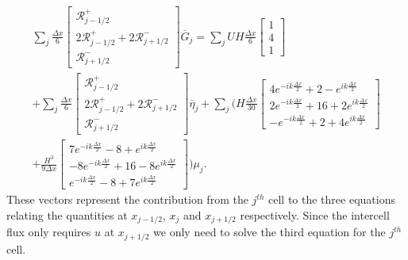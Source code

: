 \begin{multline*}
\sum_j \frac{\Delta x}{6}\begin{bmatrix} \mathcal{R}^+_{j -1/2} \\2 \mathcal{R}^+_{j -1/2} +2 \mathcal{R}^-_{j +1/2}\\ \mathcal{R}^-_{j +1/2} \end{bmatrix} \overline{G}_{j} = \sum_jUH \frac{\Delta x}{6}\begin{bmatrix} 1 \\4 \\ 1 \end{bmatrix}  \\+  \sum_j \frac{\Delta x}{6}\begin{bmatrix} \mathcal{R}^+_{j -1/2} \\2 \mathcal{R}^+_{j -1/2} +2 \mathcal{R}^-_{j +1/2}\\ \mathcal{R}^-_{j +1/2} \end{bmatrix} \overline{\eta}_{j}  + \sum_j \Bigg(H\frac{\Delta x}{30}\begin{bmatrix} 4e^{-ik\frac{\Delta x}{2}} +  2 - e^{ik\frac{\Delta x}{2}}\\2e^{-ik\frac{\Delta x}{2}}  + 16  +2 e^{ik\frac{\Delta x}{2}}  \\ -e^{-ik\frac{\Delta x}{2}} +  2 + 4e^{ik\frac{\Delta x}{2}} \end{bmatrix} \\+ \frac{H^3 }{9\Delta x}\begin{bmatrix} 7e^{-ik\frac{\Delta x}{2}} -8 + e^{ik\frac{\Delta x}{2}} \\ -8e^{-ik\frac{\Delta x}{2}} +  16  -8e^{ik\frac{\Delta x}{2}} \\ e^{-ik\frac{\Delta x}{2}} -8 + 7e^{ik\frac{\Delta x}{2}} \end{bmatrix}  \Bigg) \mu_j.
\end{multline*}
These vectors represent the contribution from the $j^{th}$ cell to the three equations relating the quantities at $x_{j-1/2}$, $x_j$ and $x_{j+1/2}$ respectively. Since the intercell flux only requires $u$ at $x_{j+1/2}$ we only need to solve the third equation for the $j^{th}$ cell.

